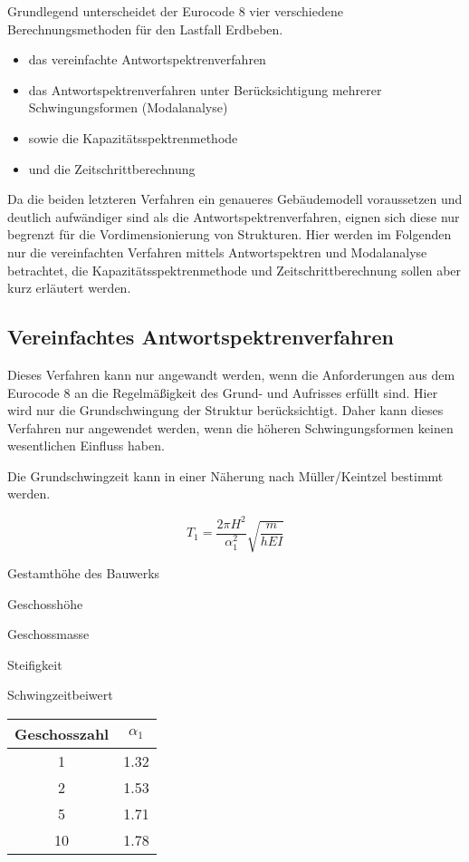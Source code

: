 Grundlegend unterscheidet der Eurocode 8 vier verschiedene Berechnungsmethoden für den Lastfall Erdbeben.

\begin{itemize}
  \item das vereinfachte Antwortspektrenverfahren
  \item das Antwortspektrenverfahren unter Berücksichtigung mehrerer Schwingungsformen (Modalanalyse)
  \item sowie die Kapazitätsspektrenmethode
  \item und die Zeitschrittberechnung
\end{itemize}

Da die beiden letzteren Verfahren ein genaueres Gebäudemodell voraussetzen und deutlich aufwändiger sind als die Antwortspektrenverfahren, eignen sich diese nur begrenzt für die Vordimensionierung von Strukturen. 
Hier werden im Folgenden nur die vereinfachten Verfahren mittels Antwortspektren und Modalanalyse betrachtet, die Kapazitätsspektrenmethode und Zeitschrittberechnung sollen aber kurz erläutert werden.

\pagebreak

\subsection{Vereinfachtes Antwortspektrenverfahren}
\label{sec:Antwortspektrenverfahren}

Dieses Verfahren kann nur angewandt werden, wenn die Anforderungen aus dem Eurocode 8 an die Regelmäßigkeit des Grund- und Aufrisses erfüllt sind.
Hier wird nur die Grundschwingung der Struktur berücksichtigt. Daher kann dieses Verfahren nur angewendet werden, wenn die höheren Schwingungsformen keinen wesentlichen Einfluss haben.

Die Grundschwingzeit kann in einer Näherung nach Müller/Keintzel bestimmt werden.

\begin{equation*}
T_1 = \frac{2 \pi H^2}{\alpha_1^2}\sqrt{\frac{m}{hEI}}
\end{equation*}

\thinspace

\begin{multicols}{2}
 Gestamthöhe des Bauwerks \par
{} Geschosshöhe \par
{} Geschossmasse \par
{} Steifigkeit \par 
{} Schwingzeitbeiwert \par
\columnbreak
\begin{flushright}
\begin{tabular}{ |c|c| } 
 \hline
 Geschosszahl & $\alpha_1$ \\
 \hline\hline
 1 & 1.32 \\ 
 2 & 1.53 \\ 
 5 & 1.71 \\ 
 10 & 1.78 \\ 
 \hline
\end{tabular}
\end{flushright}
\end{multicols}

